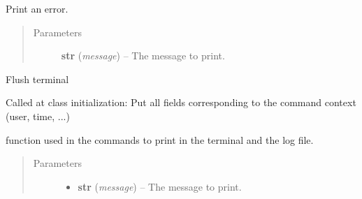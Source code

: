 \documentclass[a4paper,10pt,english]{sphinxmanual}
\begin{document}
\begin{fulllineitems}
\begin{fulllineitems}
\begin{quote}
\begin{description}
\end{description}\end{quote}

\end{fulllineitems}


\begin{fulllineitems}
\label{commands/apidoc/src:src.logger.Logger.error}
Print an error.
\begin{quote}\begin{description}
\item[{Parameters}] \leavevmode
\textbf{str} (\emph{message}) -- The message to print.

\end{description}\end{quote}

\end{fulllineitems}


\begin{fulllineitems}
\label{commands/apidoc/src:src.logger.Logger.flush}
Flush terminal

\end{fulllineitems}


\begin{fulllineitems}
\label{commands/apidoc/src:src.logger.Logger.put_initial_xml_fields}
Called at class initialization: Put all fields 
corresponding to the command context (user, time, ...)

\end{fulllineitems}


\begin{fulllineitems}
\label{commands/apidoc/src:src.logger.Logger.write}
function used in the commands 
to print in the terminal and the log file.
\begin{quote}\begin{description}
\item[{Parameters}] \leavevmode\begin{itemize}
\item {} 
\textbf{str} (\emph{message}) -- The message to print.


\end{itemize}
\end{description}
\end{quote}
\end{fulllineitems}
\end{fulllineitems}
\end{document}
